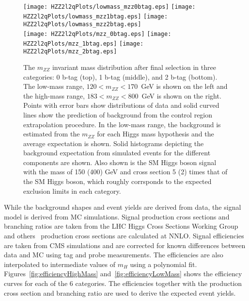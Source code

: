 \begin{figure}
\begin{center}
\texttt{[image: HZZ2l2qPlots/lowmass\_mzz0btag.eps]}
\texttt{[image: HZZ2l2qPlots/lowmass\_mzz1btag.eps]}
\texttt{[image: HZZ2l2qPlots/lowmass\_mzz2btag.eps]}\\
\texttt{[image: HZZ2l2qPlots/mzz\_0btag.eps]}
\texttt{[image: HZZ2l2qPlots/mzz\_1btag.eps]}
\texttt{[image: HZZ2l2qPlots/mzz\_2btag.eps]}
\caption{The $m_{ZZ}$ invariant mass distribution after final selection in
three categories: 0 b-tag (top), 1 b-tag (middle), and 2 b-tag (bottom). 
The low-mass range, $120<m_{ZZ}<170$~GeV is shown on the left and the
high-mass range, $183<m_{ZZ}<800$~GeV is shown on the right.  Points with
error bars show distributions of data and solid curved lines show the 
prediction of background from the control region extrapolation procedure.
In the low-mass range, the background is estimated from the $m_{ZZ}$ for
each Higgs mass hypothesis and the average expectation is shown.  Solid
histograms depicting the background expectation from simulated events
for the different components are shown.  Also shown is the SM Higgs boson
signal with the mass of 150 (400) GeV and cross section 5 (2) times that 
of the SM Higgs boson, which roughly corrsponds to the expected exclusion 
limits in each category.}
\label{fig:HZZ2l2qMassDistributions}
\end{center}
\end{figure}

While the background shapes and event yields are derived from data, the signal
model is derived from MC simulations.  Signal production cross sections
and branching ratios are taken from the LHC Higgs Cross Sections Working
Group and 
others~\cite{Anastasiou:2008tj,deFlorian:2009hc,Baglio:2010ae,Dittmaier:2011ti,Djouadi:1991tka,Dawson:1990zj,Spira:1995rr,Harlander:2002wh,Anastasiou:2002yz,Ravindran:2003um,Catani:2003zt,Actis:2008ug,Aglietti:2004nj,Anastasiou:2008tj,Ciccolini:2007jr,Ciccolini:2007ec,Figy:2003nv,Arnold:2008rz,Bolzoni:2010xr,Figy:2010ct,Djouadi:1997yw,Bredenstein:2006rh,Bredenstein:2006ha}
production cross sections are calculated at NNLO.  Signal
efficiencies are taken from CMS simulations and are
corrected for known differences between data and MC using tag and
probe measurements.  The efficiencies are also interpolated to 
intermediate values of $m_H$ using a polynomial fit.  
Figures~\ref{fig:efficiencyHighMass}
and~\ref{fig:efficiencyLowMass}
shows the efficiency curves for each of the 6 categories.  The 
efficiencies together with the production cross section and
branching ratio are used to derive the expected event yields.

